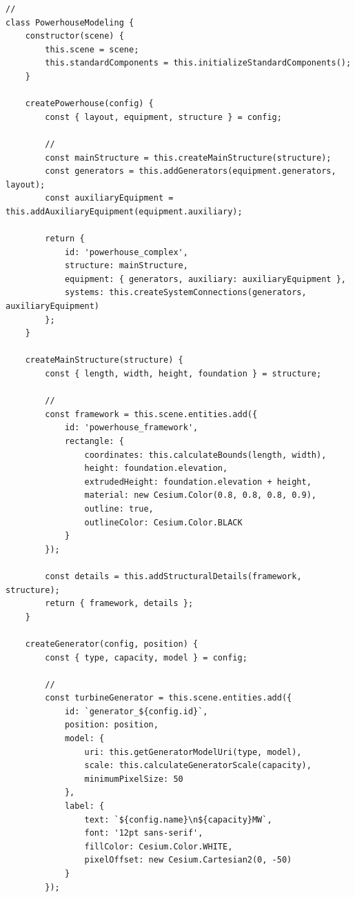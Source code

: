 \begin{verbatim}
// 
class PowerhouseModeling {
    constructor(scene) {
        this.scene = scene;
        this.standardComponents = this.initializeStandardComponents();
    }
    
    createPowerhouse(config) {
        const { layout, equipment, structure } = config;
        
        // 
        const mainStructure = this.createMainStructure(structure);
        const generators = this.addGenerators(equipment.generators, layout);
        const auxiliaryEquipment = this.addAuxiliaryEquipment(equipment.auxiliary);
        
        return {
            id: 'powerhouse_complex',
            structure: mainStructure,
            equipment: { generators, auxiliary: auxiliaryEquipment },
            systems: this.createSystemConnections(generators, auxiliaryEquipment)
        };
    }
    
    createMainStructure(structure) {
        const { length, width, height, foundation } = structure;
        
        // 
        const framework = this.scene.entities.add({
            id: 'powerhouse_framework',
            rectangle: {
                coordinates: this.calculateBounds(length, width),
                height: foundation.elevation,
                extrudedHeight: foundation.elevation + height,
                material: new Cesium.Color(0.8, 0.8, 0.8, 0.9),
                outline: true,
                outlineColor: Cesium.Color.BLACK
            }
        });
        
        const details = this.addStructuralDetails(framework, structure);
        return { framework, details };
    }
    
    createGenerator(config, position) {
        const { type, capacity, model } = config;
        
        // 
        const turbineGenerator = this.scene.entities.add({
            id: `generator_${config.id}`,
            position: position,
            model: {
                uri: this.getGeneratorModelUri(type, model),
                scale: this.calculateGeneratorScale(capacity),
                minimumPixelSize: 50
            },
            label: {
                text: `${config.name}\n${capacity}MW`,
                font: '12pt sans-serif',
                fillColor: Cesium.Color.WHITE,
                pixelOffset: new Cesium.Cartesian2(0, -50)
            }
        });
        

\end{verbatim}
